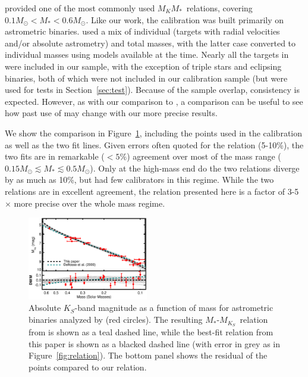 \documentclass[twocolumn]{aastex62}
\newcommand{\mks}{$M_{K_S}$}
\newcommand{\mmkc}{$M_{K}$\textendash$M_*$}
\begin{document}
\citet{Delfosse2000} provided one of the most commonly used \mmkc\ relations, covering $0.1M_\odot<M_*<0.6M_\odot$. Like our work, the calibration was built primarily on astrometric binaries. \citet{Delfosse2000} used a mix of individual (targets with radial velocities and/or absolute astrometry) and total masses, with the latter case converted to individual masses using models available at the time. Nearly all the targets in \citet{Delfosse2000} were included in our sample, with the exception of triple stars and eclipsing binaries, both of which were not included in our calibration sample (but were used for tests in Section~\ref{sec:test}). Because of the sample overlap, consistency is expected. However, as with our comparison to \citet{Hen1993}, a comparison can be useful to see how past use of \citet{Delfosse2000} may change with our more precise results.

We show the comparison in Figure~\ref{fig:delfosse}, including the points used in the \citet{Delfosse2000} calibration as well as the two fit lines. Given errors often quoted for the \citet{Delfosse2000} relation (5-10\%), the two fits are in remarkable ($<5\%$) agreement over most of the mass range ($0.15M_\odot \lesssim M_* \lesssim 0.5M_\odot$). Only at the high-mass end do the two relations diverge by as much as 10\%, but \citet{Delfosse2000} had few calibrators in this regime. While the two relations are in excellent agreement, the relation presented here is a factor of 3-5$\times$ more precise over the whole mass regime. 

\begin{figure}[htb]
\begin{center}
\includegraphics[width=0.47\textwidth]{Delfosse_comp.eps}
\caption{Absolute $K_S$-band magnitude as a function of mass for astrometric binaries analyzed by \citet{Delfosse2000} (red circles). The resulting $M_*$-\mks\ relation from \citet{Delfosse2000} is shown as a teal dashed line, while the best-fit relation from this paper is shown as a blacked dashed line (with error in grey as in Figure~\ref{fig:relation}). The bottom panel shows the residual of the \citet{Delfosse2000} points compared to our relation.}
\label{fig:delfosse}
\end{center}
\end{figure}
\end{document}

